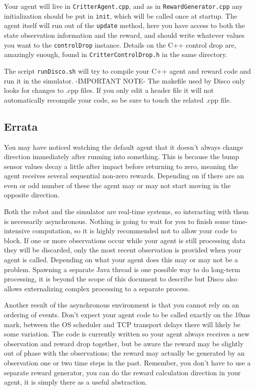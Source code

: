 \documentclass[12pt]{article}
\begin{document}
Your agent will live in \verb+CritterAgent.cpp+, and as in \verb+RewardGenerator.cpp+ any initialization should be put in \verb+init+, which will be called once at startup.  The agent itself will run out of the \verb+update+ method, here you have access to both the state observation information and the reward, and should write whatever values you want to the \verb+controlDrop+ instance.  Details on the C++ control drop are, amazingly enough, found in \verb+CritterControlDrop.h+ in the same directory.

The script \verb+runDisco.sh+ will try to compile your C++ agent and reward code and run it in the simulator.  -IMPORTANT NOTE-  The makefile used by Disco only looks for changes to .cpp files.  If you only edit a header file it will not automatically recompile your code, so be sure to touch the related .cpp file.

\subsection{Errata}\label{subsec:programming_exercises}

You may have noticed watching the default agent that it doesn't always change direction immediately after running into something.  This is because the bump sensor values decay a little after impact before returning to zero, meaning the agent receives several sequential non-zero rewards.  Depending on if there are an even or odd number of these the agent may or may not start moving in the opposite direction.

Both the robot and the simulator are real-time systems, so interacting with them is necessarily asynchronous.  Nothing is going to wait for you to finish some time-intensive computation, so it is highly recommended not to allow your code to block.  If one or more observations occur while your agent is still processing data they will be discarded, only the most recent observation is provided when your agent is called.  Depending on what your agent does this may or may not be a problem.  Spawning a separate Java thread is one possible way to do long-term processing, it is beyond the scope of this document to describe but Disco also allows externalizing complex processing to a separate process.

Another result of the asynchronous environment is that you cannot rely on an ordering of events.  Don't expect your agent code to be called exactly on the 10ms mark, between the OS scheduler and TCP transport delays there will likely be some variation.  The code is currently written so your agent always receives a new observation and reward drop together, but be aware the reward may be slightly out of phase with the observations; the reward may actually be generated by an observation one or two time steps in the past.  Remember, you don't have to use a separate reward generator, you can do the reward calculation direction in your agent, it is simply there as a useful abstraction.
\end{document}

